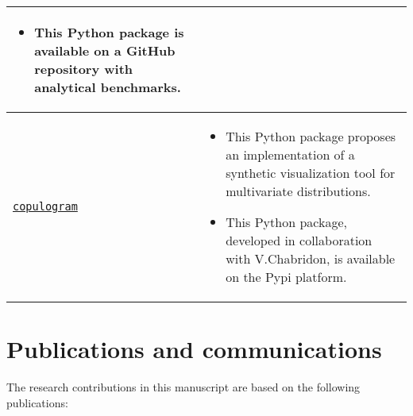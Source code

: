 \begin{center}
\begin{tabularx}{\textwidth}{l >{\raggedleft\arraybackslash}X}
\begin{itemize}[left=0pt]
        \item This Python package is available on a GitHub repository with analytical benchmarks.
    \end{itemize}\\ \hline
    \href{https://github.com/efekhari27/copulogram}{\texttt{copulogram}}\footnotemark &    
    \begin{itemize}[left=0pt]
        \item This Python package proposes an implementation of a synthetic visualization tool for multivariate distributions. 
        \item This Python package, developed in collaboration with V.Chabridon, is available on the Pypi platform.
    \end{itemize}\\
\end{tabularx} 
\end{center}


\newpage
\section*{Publications and communications}

The research contributions in this manuscript are based on the following publications: 

